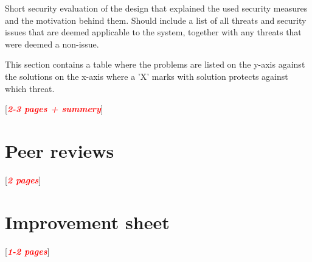 \documentclass[10pt]{article}
\newcommand{\comm}[1]{{\leavevmode\color{gray}#1}}
\newcommand{\todo}[1]{
  \begin{center}
    [\textcolor{red}{\textbf{\textit{#1}}}]
  \end{center}
}
\begin{document}
  \comm{%
    Short security evaluation of the design that explained the used security
    measures and the motivation behind them. Should include a list of all
    threats and security issues that are deemed applicable to the system,
    together with any threats that were deemed a non-issue.

    This section contains a table where the problems are listed on the y-axis
    against the solutions on the x-axis where a 'X' marks with solution
    protects against which threat.
  }

    \todo{2-3 pages + summery}

    

  \section{Peer reviews}
    \todo{2 pages}

  \section{Improvement sheet}
    \todo{1-2 pages}
\end{document}
